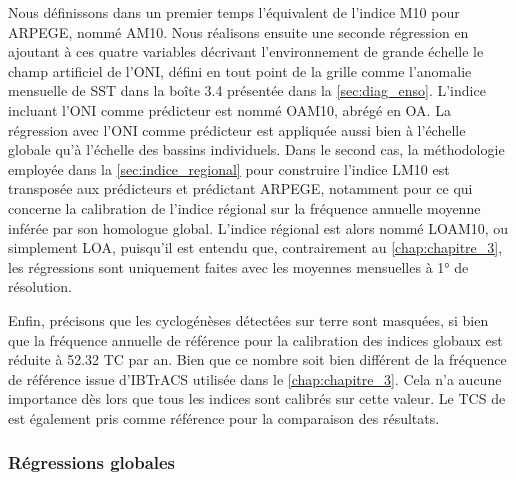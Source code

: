 \documentclass[../main.tex]{subfiles}
\begin{document}
Nous définissons dans un premier temps l'équivalent de l'indice M10 pour ARPEGE, nommé AM10. Nous réalisons ensuite une seconde régression en ajoutant à
ces quatre variables décrivant l'environnement de grande échelle le champ artificiel de l'ONI, défini en tout point de la grille comme l'anomalie
mensuelle de SST dans la boîte 3.4 présentée dans la \cref{sec:diag_enso}. L'indice incluant l'ONI comme prédicteur est nommé OAM10, abrégé en OA. La régression
avec l'ONI comme prédicteur est appliquée aussi bien à l'échelle globale qu'à l'échelle des bassins individuels. Dans le second cas, la méthodologie employée
dans la \cref{sec:indice_regional} pour construire l'indice LM10 est transposée aux prédicteurs et prédictant ARPEGE, notamment pour ce qui concerne la
calibration de l'indice régional sur la fréquence annuelle moyenne inférée par son homologue global. L'indice régional est alors nommé LOAM10, ou simplement
LOA, puisqu'il est entendu que, contrairement au \cref{chap:chapitre_3}, les régressions sont uniquement faites avec les moyennes mensuelles à \ang{1} de
résolution.

Enfin, précisons que les cyclogénèses détectées sur terre sont masquées, si bien que la fréquence annuelle de référence pour la calibration des indices globaux
est réduite à \num{52.32} TC par an. Bien que ce nombre soit bien différent de la fréquence de référence issue d'IBTrACS utilisée dans le \cref{chap:chapitre_3}.
Cela n'a aucune importance dès lors que tous les indices sont calibrés sur cette valeur. Le TCS de \textcite{tippett_poisson_2011} est également pris comme
référence pour la comparaison des résultats.

\subsubsection{Régressions globales}
\end{document}
